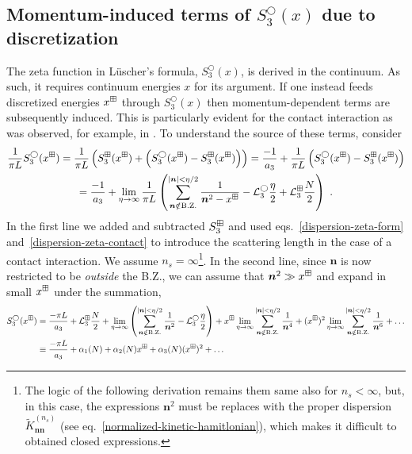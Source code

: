 \subsection{Momentum-induced terms of  \texorpdfstring{$S^\bigcirc_3(x)$}{S3-spherical} due to discretization\label{sect:3d induced momenta}}
The zeta function in L\"uscher's formula, $S^\bigcirc_3(x)$, is derived in the continuum.
As such, it requires continuum energies $x$ for its argument.
If one instead feeds discretized energies $x^\boxplus$ through $S^\bigcirc_3(x)$ then momentum-dependent terms are subsequently induced.
This is particularly evident for the contact interaction as was observed, for example, in \cite{Endres:2012cw}.
To understand the source of these terms, consider
\begin{multline}
\frac{1}{\pi L}S^\bigcirc_3(x^\dispersion)=\frac{1}{\pi L}\left(S^{\dispersion}_3(x^\dispersion)+\left(S^\bigcirc_3(x^\dispersion)-S^{\dispersion}_3(x^\dispersion)\right)\right)=\frac{-1}{a_3}+\frac{1}{\pi L}\left(S^\bigcirc_3(x^\dispersion)-S^{\dispersion}_3(x^\dispersion)\right)\\
=\frac{-1}{a_3}+\lim_{\eta \to\infty}\frac{1}{\pi L}\left(\sum_{\bm n\notin \mathrm{B.Z.}}^{|\bm n|<\eta / 2} \frac{1}{\bm n^{2}-x^\dispersion}-\mathcal{L}^\bigcirc_3\frac{\eta}{2}+\mathcal{L}^\dispersion_3\frac{N}{2}\right)\ .
\end{multline}
In the first line we added and subtracted $S^\boxplus_3$ and used eqs.~\eqref{dispersion-zeta-form} and~\eqref{dispersion-zeta-contact} to introduce the scattering length in the case of a contact interaction.
We assume $n_s=\infty$\footnote{
The logic of the following derivation remains them same also for $n_s < \infty$, but, in this case, the expressions $\bm n^2$ must be replaces with the proper dispersion $\tilde K^{(n_s)}_{\bm n \bm n}$ (see eq.~\eqref{normalized-kinetic-hamitlonian}), which makes it difficult to obtained closed expressions.}.
In the second line, since $\bm n$ is now restricted to be \emph{outside} the B.Z., we can assume that $\bm n^2\gg x^\boxplus$ and expand in small $x^\boxplus$ under the summation,
\begin{align}
	\label{eqn:observable}
	S^\bigcirc_3(x^\boxplus)
	&= 
	\frac{-\pi L}{a_3}
	+\mathcal{L}^\boxplus_3\frac{N}{2}
	+\lim_{\eta \to\infty}\left(\sum_{\bm n\notin \mathrm{B.Z.}}^{|\bm n|<\eta / 2} \frac{1}{\bm n^{2}}
	-\mathcal{L}^\bigcirc_3\frac{\eta}{2}\right)
	+x^\boxplus\lim_{\eta \to\infty}\sum_{\bm n\notin \mathrm{B.Z.}}^{|\bm n|<\eta / 2} \frac{1}{\bm n^{4}}
	+(x^\boxplus)^2\lim_{\eta \to\infty}\sum_{\bm n\notin \mathrm{B.Z.}}^{|\bm n|<\eta / 2} \frac{1}{\bm n^{6}}
	+ \ldots
	\\
	\label{eq:small x}
	&\equiv \frac{-\pi L}{a_3}+\alpha_1(N)+\alpha_2(N)x^\boxplus+\alpha_3(N)(x^\boxplus)^2
	+\ldots
\end{align}
